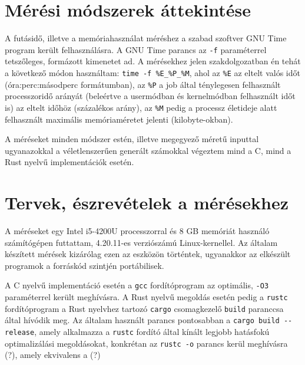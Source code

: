 

\section{Mérési módszerek áttekintése}
A futásidő, illetve a memóriahasználat méréshez a szabad szoftver GNU Time program került felhasználásra. A GNU Time parancs az \lstinline{-f} paraméterrel tetszőleges, formázott kimenetet ad. A mérésekhez jelen szakdolgozatban én tehát a következő módon használtam: \lstinline{time -f %E_%P_%M}, ahol az \lstinline{%E} az eltelt valós időt (óra:perc:másodperc formátumban), az \lstinline{%P} a job által ténylegesen felhasznált processzoridő arányát (beleértve a usermódban és kernelmódban felhasznált időt is) az eltelt időhöz (százalékos arány), az \lstinline{%M} pedig a processz életideje alatt felhasznált maximális memóriaméretet jelenti (kilobyte-okban).

A méréseket minden módszer estén, illetve megegyező méretű inputtal ugyanazokkal a véletlenszerűen generált számokkal végeztem mind a C, mind a Rust nyelvű implementációk esetén.

\section{Tervek, észrevételek a mérésekhez}
A méréseket egy Intel i5-4200U processzorral és 8 GB memóriát használó számítógépen futtattam, 4.20.11-es verziószámú Linux-kernellel. Az általam készített mérések kizárólag ezen az eszközön történtek, ugyanakkor az elkészült programok a forráskód szintjén portábilisek.

A C nyelvű implementáció esetén a \lstinline{gcc} fordítóprogram az optimális, \lstinline{-O3} paraméterrel került meghívásra. A Rust nyelvű megoldás esetén pedig a \lstinline{rustc} fordítóprogram a Rust nyelvhez tartozó \lstinline{cargo} csomagkezelő \lstinline{build} paranccsa által hívódik meg. Az általam használt parancs pontosabban a \lstinline{cargo build --release}, amely alkalmazza a \lstinline{rustc} fordító által kínált legjobb hatásfokú optimalizálási megoldásokat, konkrétan az \lstinline{rustc -o} parancs kerül meghívásra (?), amely ekvivalens a (?)
